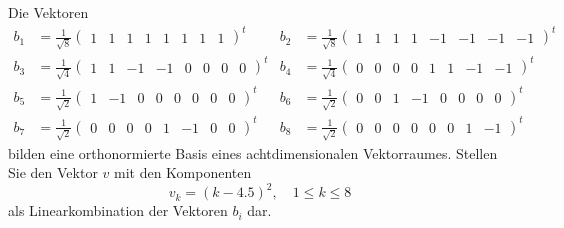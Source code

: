 Die Vektoren
\begin{align*}
b_1&=\frac1{\sqrt{8}} \begin{pmatrix}1&1&1&1&1&1&1&1\end{pmatrix}^t&
b_2&=\frac1{\sqrt{8}} \begin{pmatrix}1&1&1&1&-1&-1&-1&-1\end{pmatrix}^t\\
b_3&=\frac1{\sqrt{4}} \begin{pmatrix}1&1&-1&-1&0&0&0&0\end{pmatrix}^t&
b_4&=\frac1{\sqrt{4}} \begin{pmatrix} 0&0&0&0&1&1&-1&-1\end{pmatrix}^t\\
b_5&=\frac1{\sqrt{2}} \begin{pmatrix}1&-1&0&0&0&0&0&0\end{pmatrix}^t&
b_6&=\frac1{\sqrt{2}} \begin{pmatrix}0&0&1&-1&0&0&0&0\end{pmatrix}^t\\
b_7&=\frac1{\sqrt{2}} \begin{pmatrix}0&0&0&0&1&-1&0&0\end{pmatrix}^t&
b_8&=\frac1{\sqrt{2}} \begin{pmatrix}0&0&0&0&0&0&1&-1\end{pmatrix}^t
\end{align*}
bilden eine orthonormierte Basis eines achtdimensionalen Vektorraumes.
Stellen Sie den Vektor $v$ mit den Komponenten
\[
v_k=(k-4.5)^2,\quad{1\le k\le 8}
\]
als Linearkombination der Vektoren $b_i$ dar.


